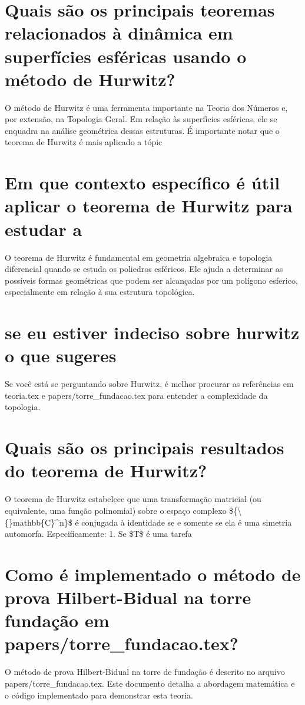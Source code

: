 \documentclass[11pt,a4paper]{article}
\begin{document}
\section{Quais são os principais teoremas relacionados à dinâmica em superfícies esféricas usando o método de Hurwitz?}
O método de Hurwitz é uma ferramenta importante na Teoria dos Números e, por extensão, na Topologia Geral. Em relação às superfícies esféricas, ele se enquadra na análise geométrica dessas estruturas. É importante notar que o teorema de Hurwitz é mais aplicado a tópic

\section{Em que contexto específico é útil aplicar o teorema de Hurwitz para estudar a}
O teorema de Hurwitz é fundamental em geometria algebraica e topologia diferencial quando se estuda os poliedros esféricos. Ele ajuda a determinar as possíveis formas geométricas que podem ser alcançadas por um polígono esferico, especialmente em relação à sua estrutura topológica.

\section{se eu estiver indeciso sobre hurwitz o que sugeres}
Se você está se perguntando sobre Hurwitz, é melhor procurar as referências em teoria.tex e papers/torre\_fundacao.tex para entender a complexidade da topologia.

\section{Quais são os principais resultados do teorema de Hurwitz?}
O teorema de Hurwitz estabelece que uma transformação matricial (ou equivalente, uma função polinomial) sobre o espaço complexo \$\{\textbackslash\{\}mathbb\{C\}^n\}\$ é conjugada à identidade se e somente se ela é uma simetria automorfa. Especificamente: 1. Se \$T\$ é uma tarefa

\section{Como é implementado o método de prova Hilbert-Bidual na torre fundação em papers/torre\_fundacao.tex?}
O método de prova Hilbert-Bidual na torre de fundação é descrito no arquivo papers/torre\_fundacao.tex. Este documento detalha a abordagem matemática e o código implementado para demonstrar esta teoria.
\end{document}
